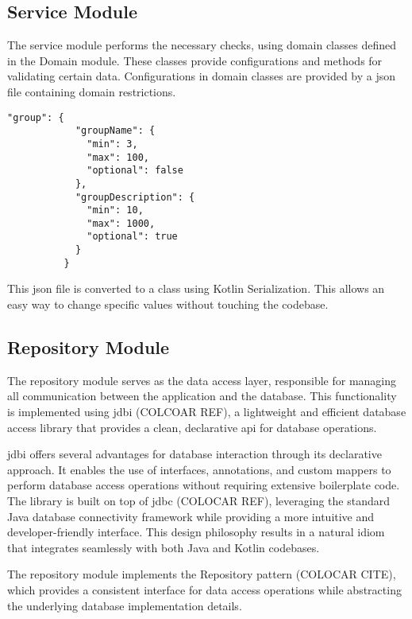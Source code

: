 \subsection*{Service Module}
The service module performs the necessary checks, using domain classes defined in the Domain module. These classes provide configurations and methods for validating certain data. Configurations in domain classes are provided by a \ac{json} file containing domain restrictions.

\begin{center}
    \begin{lstlisting}[caption={Example of the group entry}]
        "group": {
            "groupName": {
              "min": 3,
              "max": 100,
              "optional": false
            },
            "groupDescription": {
              "min": 10,
              "max": 1000,
              "optional": true
            }
          }
    \end{lstlisting}
\end{center}

This \ac{json} file is converted to a class using Kotlin Serialization. This allows an easy way to change specific values without touching the codebase.

\subsection*{Repository Module}
The repository module serves as the data access layer, responsible for managing all communication between the application and the database. This functionality is implemented using \ac{jdbi} (COLCOAR REF), a lightweight and efficient database access library that provides a clean, declarative \acs{api} for database operations.

\ac{jdbi} offers several advantages for database interaction through its declarative approach. It enables the use of interfaces, annotations, and custom mappers to perform database access operations without requiring extensive boilerplate code. The library is built on top of \ac{jdbc} (COLOCAR REF), leveraging the standard Java database connectivity framework while providing a more intuitive and developer-friendly interface. This design philosophy results in a natural idiom that integrates seamlessly with both Java and Kotlin codebases.

The repository module implements the Repository pattern (COLOCAR CITE), which provides a consistent interface for data access operations while abstracting the underlying database implementation details.

